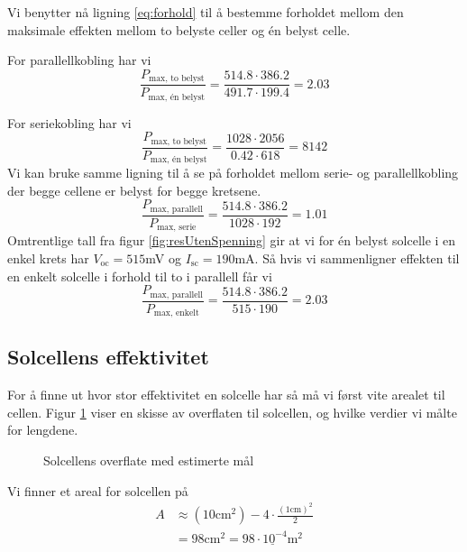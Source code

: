 \documentclass[a4paper,11pt, twocolumn]{article}
\begin{document}
Vi benytter nå ligning \eqref{eq:forhold} til å bestemme forholdet mellom den maksimale effekten mellom to belyste celler og \'en belyst celle. 

For parallellkobling har vi 
\begin{equation}
	\frac{P_\text{max, to belyst}}{P_\text{max, \'en belyst}} = \frac{514.8\cdot386.2}{491.7\cdot199.4} = 2.03
\end{equation}

For seriekobling har vi 
\begin{equation}
	\frac{P_\text{max, to belyst}}{P_\text{max, \'en belyst}} = \frac{1028\cdot2056}{0.42\cdot618} = 8142
\end{equation}
Vi kan bruke samme ligning til å se på forholdet mellom serie- og parallellkobling der begge cellene er belyst for begge kretsene.
\begin{equation}
	\frac{P_\text{max, parallell}}{P_\text{max, serie}} = \frac{514.8\cdot386.2}{1028\cdot192} = 1.01
\end{equation}
Omtrentlige tall fra figur \ref{fig:resUtenSpenning} gir at vi for \'en  belyst solcelle i en enkel krets har $V_\text{oc}=515$mV og $I_\text{sc}=190$mA. Så hvis vi sammenligner effekten til en enkelt solcelle i forhold til to i parallell får vi
\begin{equation}
	\frac{P_\text{max, parallell}}{P_\text{max, enkelt}} = \frac{514.8\cdot386.2}{515\cdot190} = 2.03
\end{equation}
\subsection{Solcellens effektivitet}
For å finne ut hvor stor effektivitet en solcelle har så må vi først vite arealet til cellen. Figur \ref{fig:solcelleoverflate} viser en skisse av overflaten til solcellen, og hvilke verdier vi målte for lengdene.
\begin{figure}[!ht]
\centering
	\caption{Solcellens overflate med estimerte mål}
	\label{fig:solcelleoverflate}
\end{figure}
Vi finner et areal for solcellen på
\begin{align}
	A &\approx (10\text{cm}^2)-4\cdot\frac{(1\text{cm})^2}{2}\\
	&= 98\text{cm}^2 = \underline{98\cdot 10^{-4}\text{m}^2}
\end{align}
\end{document}
